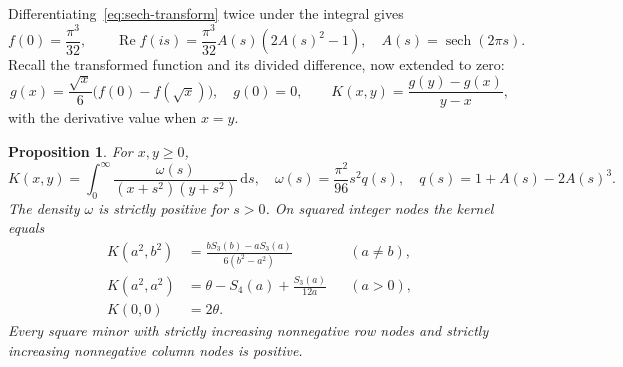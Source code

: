 \documentclass[11pt]{article}
\newtheorem{proposition}[theorem]{Proposition}
\theoremstyle{definition}
\theoremstyle{remark}
\numberwithin{equation}{section}
\newcommand{\dd}{\,\mathrm d}
\DeclareMathOperator{\sech}{sech}
\DeclareMathOperator{\Ree}{Re}
\begin{document}
Differentiating~\eqref{eq:sech-transform} twice under the integral gives
\begin{equation}\label{eq:f-fourier}
 f(0)=\frac{\pi^3}{32},\qquad
 \Ree f(is)=\frac{\pi^3}{32}A(s)(2A(s)^2-1),
 \quad A(s)=\sech(2\pi s).
\end{equation}
Recall the transformed function and its divided difference, now extended
to zero:
\begin{equation}\label{eq:gK}
 g(x)=\frac{\sqrt{x}}6\bigl(f(0)-f(\sqrt{x})\bigr),\quad g(0)=0,
 \qquad K(x,y)=\frac{g(y)-g(x)}{y-x},
\end{equation}
with the derivative value when $x=y$.

\begin{proposition}\label{prop:kernel}
For $x,y\geq0$,
\begin{equation}\label{eq:K-integral}
 K(x,y)=\int_0^\infty
 \frac{\omega(s)}{(x+s^2)(y+s^2)}\dd s,
 \quad
 \omega(s)=\frac{\pi^2}{96}s^2q(s),\quad
 q(s)=1+A(s)-2A(s)^3.
\end{equation}
The density $\omega$ is strictly positive for $s>0$. On squared integer
nodes the kernel equals
\begin{align}
 K(a^2,b^2)&=\frac{bS_3(b)-aS_3(a)}{6(b^2-a^2)}&& (a\ne b),\label{eq:K-off}\\
 K(a^2,a^2)&=\theta-S_4(a)+\frac{S_3(a)}{12a}&& (a>0),\label{eq:K-diag}\\
 K(0,0)&=2\theta.\label{eq:K-zero}
\end{align}
Every square minor with strictly increasing nonnegative row nodes and
strictly increasing nonnegative column nodes is positive.
\end{proposition}
\end{document}
